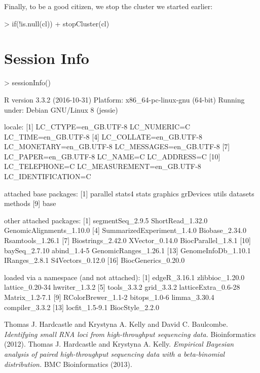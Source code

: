 \documentclass[a4paper]{article}
\begin{document}
Finally, to be a good citizen, we stop the cluster we started earlier:

\begin{Schunk}
\begin{Sinput}
> if(!is.null(cl))
+     stopCluster(cl)
\end{Sinput}
\end{Schunk}


\section*{Session Info}

\begin{Schunk}
\begin{Sinput}
> sessionInfo()
\end{Sinput}
\begin{Soutput}
R version 3.3.2 (2016-10-31)
Platform: x86_64-pc-linux-gnu (64-bit)
Running under: Debian GNU/Linux 8 (jessie)

locale:
 [1] LC_CTYPE=en_GB.UTF-8       LC_NUMERIC=C               LC_TIME=en_GB.UTF-8       
 [4] LC_COLLATE=en_GB.UTF-8     LC_MONETARY=en_GB.UTF-8    LC_MESSAGES=en_GB.UTF-8   
 [7] LC_PAPER=en_GB.UTF-8       LC_NAME=C                  LC_ADDRESS=C              
[10] LC_TELEPHONE=C             LC_MEASUREMENT=en_GB.UTF-8 LC_IDENTIFICATION=C       

attached base packages:
[1] parallel  stats4    stats     graphics  grDevices utils     datasets  methods  
[9] base     

other attached packages:
 [1] segmentSeq_2.9.5           ShortRead_1.32.0           GenomicAlignments_1.10.0  
 [4] SummarizedExperiment_1.4.0 Biobase_2.34.0             Rsamtools_1.26.1          
 [7] Biostrings_2.42.0          XVector_0.14.0             BiocParallel_1.8.1        
[10] baySeq_2.7.10              abind_1.4-5                GenomicRanges_1.26.1      
[13] GenomeInfoDb_1.10.1        IRanges_2.8.1              S4Vectors_0.12.0          
[16] BiocGenerics_0.20.0       

loaded via a namespace (and not attached):
 [1] edgeR_3.16.1        zlibbioc_1.20.0     lattice_0.20-34     hwriter_1.3.2      
 [5] tools_3.3.2         grid_3.3.2          latticeExtra_0.6-28 Matrix_1.2-7.1     
 [9] RColorBrewer_1.1-2  bitops_1.0-6        limma_3.30.4        compiler_3.3.2     
[13] locfit_1.5-9.1      BiocStyle_2.2.0    
\end{Soutput}
\end{Schunk}


\begin{thebibliography}{99}
 Thomas J. Hardcastle and Krystyna A. Kelly and David C. Baulcombe. \textsl{Identifying small RNA loci from high-throughput sequencing data.} Bioinformatics (2012).
 Thomas J. Hardcastle and Krystyna A. Kelly. \textsl{Empirical Bayesian analysis of paired high-throughput sequencing data with a beta-binomial distribution.} BMC Bioinformatics (2013).

\end{thebibliography}
\end{document}
